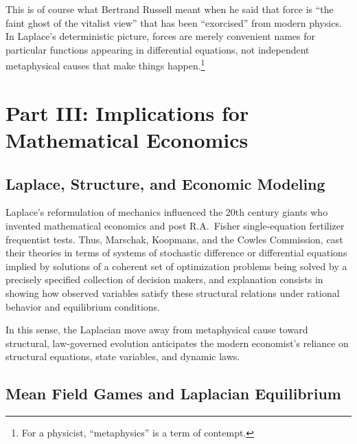 \documentclass[12pt]{article}
\begin{document}
This is of course  what Bertrand Russell meant when he said that force is ``the faint ghost of the vitalist view'' that has been ``exorcised'' from modern physics. In Laplace's deterministic picture, forces are merely convenient names for particular functions appearing in differential equations, not independent metaphysical causes that make things happen.\footnote{For a physicist, ``metaphysics'' is a term of contempt.}

%
%
%

\section{Part III: Implications for Mathematical Economics}

\subsection{Laplace, Structure, and Economic Modeling}

Laplace's reformulation of mechanics influenced the 20th century giants who invented mathematical economics and post R.A.\ Fisher single-equation fertilizer frequentist tests. Thus, Marschak, Koopmans, and the Cowles Commission, cast their theories in terms of systems of stochastic difference or differential equations implied by solutions of a coherent set of optimization problems being solved by a precisely specified collection of decision makers, and explanation consists in showing how observed variables satisfy these structural relations under rational behavior and equilibrium conditions.

In this sense, the Laplacian move away from metaphysical cause toward structural, law-governed evolution anticipates the modern economist's reliance on structural equations, state variables, and dynamic laws.


\subsection{Mean Field Games and Laplacian Equilibrium}
\end{document}
